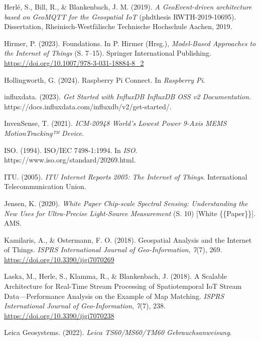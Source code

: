 \documentclass[
  11pt,
  a4paperpaper,
  oneside, openany  ,captions=tableheading
]{scrbook}
\newlength{\cslhangindent}
\newenvironment{CSLReferences}[2] %
  {\begin{list}{}{%
   \setlength{\itemindent}{0pt}
   \setlength{\leftmargin}{0pt}
   \setlength{\parsep}{0pt}
   \ifodd #1
    \setlength{\leftmargin}{\cslhangindent}
    \setlength{\itemindent}{-1\cslhangindent}
   \fi
   \setlength{\itemsep}{#2\baselineskip}}}
  {\end{list}}
\theoremstyle{definition}
\theoremstyle{remark}
\begin{document}
\begin{CSLReferences}{1}{0}
Herlé, S., Bill, R., \& Blankenbach, J. M. (2019). \emph{{A
GeoEvent-driven architecture based on GeoMQTT for the Geospatial IoT}}
(phdthesis RWTH-2019-10695). Dissertation, Rheinisch-Westf{ä}lische
Technische Hochschule Aachen, 2019.

Hirmer, P. (2023). Foundations. In P. Hirmer (Hrsg.), \emph{Model-{Based
Approaches} to the {Internet} of {Things}} (S. 7--15). Springer
International Publishing.
\url{https://doi.org/10.1007/978-3-031-18884-8_2}

Hollingworth, G. (2024). Raspberry {Pi Connect}. In \emph{Raspberry Pi}.

influxdata. (2023). \emph{Get Started with {InfluxDB} {\textbar}
{InfluxDB OSS} v2 {Documentation}}.
https://docs.influxdata.com/influxdb/v2/get-started/.

InvenSense, T. (2021). \emph{{ICM-20948 World}'s {Lowest Power} 9-{Axis
MEMS MotionTracking}™ {Device}}.

ISO. (1994). {ISO}/{IEC} 7498-1:1994. In \emph{ISO}.
https://www.iso.org/standard/20269.html.

ITU. (2005). \emph{{ITU Internet Reports} 2005: {The Internet} of
{Things}}. International Telecommunication Union.

Jensen, K. (2020). \emph{White {Paper Chip-scale} Spectral Sensing:
Understanding the New Uses for Ultra-Precise Light-Source Measurement}
(S. 10) {[}White \{\{Paper\}\}{]}. AMS.

Kamilaris, A., \& Ostermann, F. O. (2018). Geospatial {Analysis} and the
{Internet} of {Things}. \emph{ISPRS International Journal of
Geo-Information}, \emph{7}(7), 269.
\url{https://doi.org/10.3390/ijgi7070269}

Laska, M., Herle, S., Klamma, R., \& Blankenbach, J. (2018). A {Scalable
Architecture} for {Real-Time Stream Processing} of {Spatiotemporal IoT
Stream Data}---{Performance Analysis} on the {Example} of {Map
Matching}. \emph{ISPRS International Journal of Geo-Information},
\emph{7}(7), 238. \url{https://doi.org/10.3390/ijgi7070238}

Leica Geosystems. (2022). \emph{Leica {TS60}/{MS60}/{TM60
Gebrauchsanweisung}}.


\end{CSLReferences}
\end{document}
